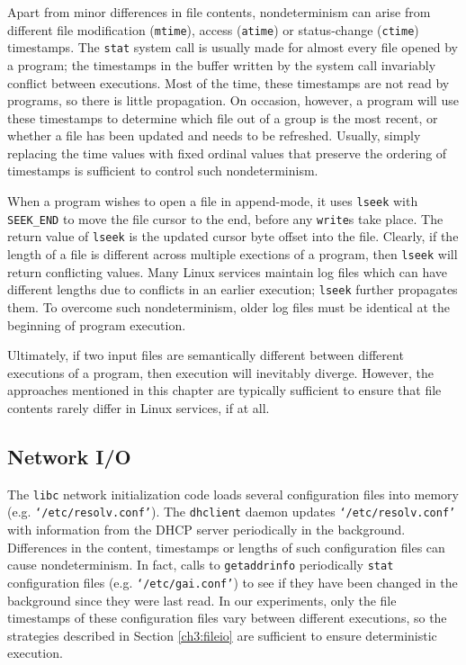 Apart from minor differences in file contents,
nondeterminism can arise from different file 
modification (\texttt{mtime}), access (\texttt{atime}) or status-change (\texttt{ctime})
timestamps.
The \texttt{stat} system call is usually made for almost
every file opened by a program; the timestamps
in the buffer written by the system call invariably
conflict between executions. Most of the time,
these timestamps are not read by programs,
so there is little propagation. On occasion, 
however, a program will use these timestamps
to determine which file out of a group is the most recent, 
or whether a file has been updated
and needs to be refreshed. Usually, simply
replacing the time values with fixed ordinal values
that preserve the ordering of timestamps is sufficient
to control such nondeterminism.

When a program wishes to open
a file in append-mode, it uses \texttt{lseek}
with \texttt{SEEK\_END} to move
the file cursor to the end,
before any \texttt{write}s take place.
The return value of \texttt{lseek} is the
updated cursor byte offset into the file.
Clearly, if the length of a file is different across
multiple exections of a program, then
\texttt{lseek} will return conflicting values.
Many Linux services maintain log files
which can have different lengths due
to conflicts in an earlier execution; \texttt{lseek}
further propagates them. To overcome
such nondeterminism, older log files
must be identical at the beginning 
of program execution.

Ultimately, if two input files are semantically different between
different executions of a program, then 
execution will inevitably diverge. However,
the approaches mentioned in this chapter
are typically sufficient to ensure that
file contents rarely differ in Linux services,
if at all.

\subsection{Network I/O} \label{ch3:netio}
The \texttt{libc} network initialization
code loads several configuration files
into memory (e.g. \texttt{`/etc/resolv.conf'}). 
The \texttt{dhclient} daemon updates \texttt{`/etc/resolv.conf'} 
with information from the DHCP server periodically in the background.
Differences in
the content, timestamps or lengths
of such configuration files can cause nondeterminism.
In fact, calls to \texttt{getaddrinfo} 
periodically \texttt{stat} configuration files (e.g. \texttt{`/etc/gai.conf'})
to see if they have been changed in the background since they were last read. 
In our experiments, only the file timestamps of these configuration files vary
between different executions, so the strategies described in Section \ref{ch3:fileio} 
are sufficient to ensure deterministic execution. 

